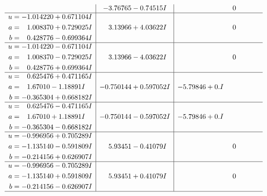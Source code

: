 \documentclass[1p]{elsarticle_modified}
\theoremstyle{definition}
\begin{document}
$$\begin{array}{c|c|c}
 & -3.76765 - 0.74515 I & \phantom{-0.000000 } 0 \\ \hline\begin{aligned}
u &= -1.014220 + 0.671104 I \\
a &= \phantom{-}1.008370 + 0.729025 I \\
b &= \phantom{-}0.428776 - 0.699364 I\end{aligned}
 & \phantom{-}3.13966 + 4.03622 I & \phantom{-0.000000 } 0 \\ \hline\begin{aligned}
u &= -1.014220 - 0.671104 I \\
a &= \phantom{-}1.008370 - 0.729025 I \\
b &= \phantom{-}0.428776 + 0.699364 I\end{aligned}
 & \phantom{-}3.13966 - 4.03622 I & \phantom{-0.000000 } 0 \\ \hline\begin{aligned}
u &= \phantom{-}0.625476 + 0.471165 I \\
a &= \phantom{-}1.67010 - 1.18891 I \\
b &= -0.365304 + 0.668182 I\end{aligned}
 & -0.750144 + 0.597052 I & -5.79846 + 0. I\phantom{ +0.000000I} \\ \hline\begin{aligned}
u &= \phantom{-}0.625476 - 0.471165 I \\
a &= \phantom{-}1.67010 + 1.18891 I \\
b &= -0.365304 - 0.668182 I\end{aligned}
 & -0.750144 - 0.597052 I & -5.79846 + 0. I\phantom{ +0.000000I} \\ \hline\begin{aligned}
u &= -0.996956 + 0.705289 I \\
a &= -1.135140 - 0.591809 I \\
b &= -0.214156 + 0.626907 I\end{aligned}
 & \phantom{-}5.93451 - 0.41079 I & \phantom{-0.000000 } 0 \\ \hline\begin{aligned}
u &= -0.996956 - 0.705289 I \\
a &= -1.135140 + 0.591809 I \\
b &= -0.214156 - 0.626907 I\end{aligned}
 & \phantom{-}5.93451 + 0.41079 I & \phantom{-0.000000 } 0\\
 \hline 
 \end{array}$$\newpage$$\begin{array}{c|c|c}  

\end{array}$$
\end{document}
